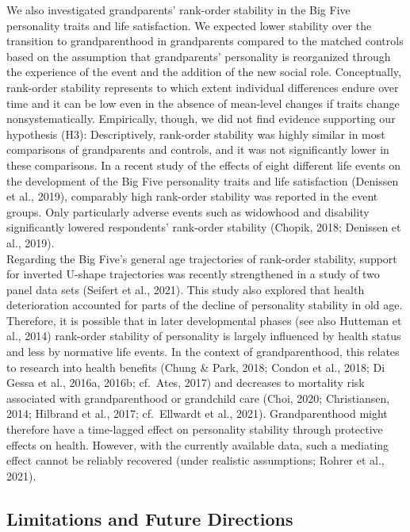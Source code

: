 \documentclass[
  english,
  man,floatsintext]{apa7}
\begin{document}
We also investigated grandparents' rank-order stability in the Big Five personality traits and life satisfaction. We expected lower stability over the transition to grandparenthood in grandparents compared to the matched controls based on the assumption that grandparents' personality is reorganized through the experience of the event and the addition of the new social role. Conceptually, rank-order stability represents to which extent individual differences endure over time and it can be low even in the absence of mean-level changes if traits change nonsystematically. Empirically, though, we did not find evidence supporting our hypothesis (H3): Descriptively, rank-order stability was highly similar in most comparisons of grandparents and controls, and it was not significantly lower in these comparisons. In a recent study of the effects of eight different life events on the development of the Big Five personality traits and life satisfaction (Denissen et al., 2019), comparably high rank-order stability was reported in the event groups. Only particularly adverse events such as widowhood and disability significantly lowered respondents' rank-order stability (Chopik, 2018; Denissen et al., 2019).\\
Regarding the Big Five's general age trajectories of rank-order stability, support for inverted U-shape trajectories was recently strengthened in a study of two panel data sets (Seifert et al., 2021). This study also explored that health deterioration accounted for parts of the decline of personality stability in old age. Therefore, it is possible that in later developmental phases (see also Hutteman et al., 2014) rank-order stability of personality is largely influenced by health status and less by normative life events. In the context of grandparenthood, this relates to research into health benefits (Chung \& Park, 2018; Condon et al., 2018; Di Gessa et al., 2016a, 2016b; cf.~Ates, 2017) and decreases to mortality risk associated with grandparenthood or grandchild care (Choi, 2020; Christiansen, 2014; Hilbrand et al., 2017; cf.~Ellwardt et al., 2021). Grandparenthood might therefore have a time-lagged effect on personality stability through protective effects on health. However, with the currently available data, such a mediating effect cannot be reliably recovered (under realistic assumptions; Rohrer et al., 2021).

\hypertarget{limitations-and-future-directions}{%
\subsection{Limitations and Future Directions}\label{limitations-and-future-directions}}
\end{document}
